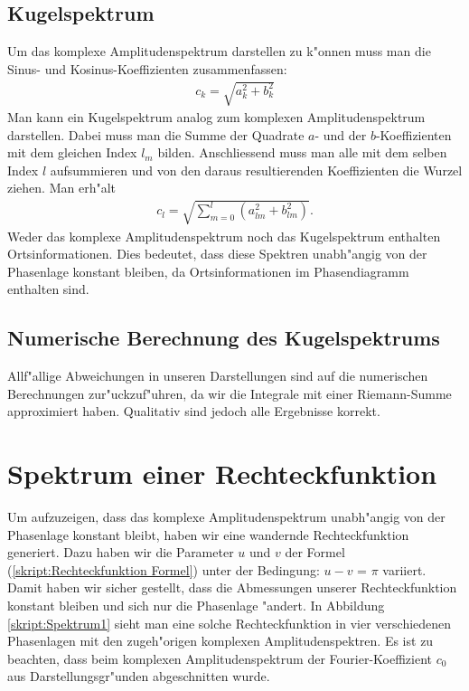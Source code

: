 \begin{refsection}
\subsection{Kugelspektrum}
Um das komplexe Amplitudenspektrum darstellen zu k"onnen muss man die
Sinus- und Kosinus-Koeffizienten zusammenfassen:
\begin{align*}
c_k= \sqrt{a^2_{k}+b^2_{k}}
\end{align*}
Man kann ein Kugelspektrum analog zum komplexen Amplitudenspektrum 
darstellen. 
Dabei muss man die Summe der Quadrate $a$- und der $b$-Koeffizienten mit 
dem gleichen Index $l_m$ bilden. Anschliessend muss man alle 
mit dem selben Index $l$ aufsummieren und von den daraus resultierenden 
Koeffizienten die Wurzel ziehen. Man erh"alt 
\begin{align*}
c_l= \sqrt{\sum_{m=0}^l (a^2_{lm}+b^2_{lm})} .
\end{align*}
Weder das komplexe Amplitudenspektrum noch das Kugelspektrum enthalten 
Ortsinformationen. 
Dies bedeutet, dass diese Spektren unabh"angig von der
Phasenlage konstant bleiben, da Ortsinformationen im 
Phasendiagramm enthalten sind.

\subsection{Numerische Berechnung des Kugelspektrums}
Allf"allige Abweichungen in unseren Darstellungen sind auf die 
numerischen Berechnungen zur"uckzuf"uhren, da wir die Integrale  
mit einer Riemann-Summe approximiert haben.
Qualitativ sind jedoch alle Ergebnisse korrekt. 

\section{Spektrum einer Rechteckfunktion}
Um aufzuzeigen, dass das komplexe Amplitudenspektrum unabh"angig von 
der Phasenlage konstant bleibt, haben wir eine wandernde 
Rechteckfunktion generiert. 
Dazu haben wir die Parameter $u$ und $v$ der Formel 
(\ref{skript:Rechteckfunktion Formel})
unter der Bedingung: $u - v$ = $\pi$ variiert.
Damit haben wir sicher gestellt, dass die Abmessungen unserer 
Rechteckfunktion konstant bleiben und sich nur die Phasenlage "andert.
In Abbildung \ref{skript:Spektrum1} sieht man eine solche 
Rechteckfunktion in vier verschiedenen Phasenlagen mit den zugeh"origen 
komplexen Amplitudenspektren. 
Es ist zu beachten, dass beim komplexen Amplitudenspektrum der 
Fourier-Koeffizient $c_0$ aus Darstellungsgr"unden abgeschnitten wurde.


\end{refsection}
